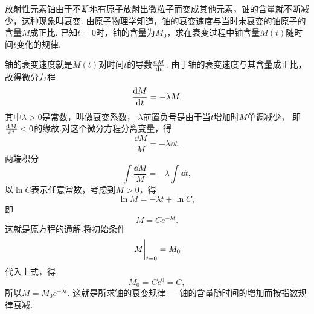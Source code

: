 \begin{example}
放射性元素铀由于不断地有原子放射出微粒子而变成其他元素，铀的含量就不断减少，这种现象叫衰变.
由原子物理学知道，铀的衰变速度与当时未衰变的铀原子的含量\(M\)成正比.
已知\(t=0\)时，铀的含量为\(M_0\)，求在衰变过程中铀含量\(M(t)\)随时间\(t\)变化的规律.
\begin{solution}
铀的衰变速度就是\(M(t)\)对时间\(t\)的导数\(\dv{M}{t}\).
由于铀的衰变速度与其含量成正比，故得微分方程\begin{equation*}
	\dv{M}{t} = -\lambda M,
\end{equation*}
其中\(\lambda > 0\)是常数，叫做衰变系数，
\(\lambda\)前置负号是由于当\(t\)增加时\(M\)单调减少，
即\(\dv{M}{t} < 0\)的缘故.对这个微分方程分离变量，得\begin{equation*}
	\frac{\dd{M}}{M} = -\lambda \dd{t}.
\end{equation*}两端积分\begin{equation*}
	\int \frac{\dd{M}}{M} = -\lambda \int \dd{t},
\end{equation*}
以\(\ln C\)表示任意常数，考虑到\(M>0\)，得\begin{equation*}
	\ln M = -\lambda t + \ln C,
\end{equation*}
即\begin{equation*}
	M = C e^{-\lambda t}.
\end{equation*}
这就是原方程的通解.将初始条件\begin{equation*}
	\eval{M}_{t=0} = M_0
\end{equation*}
代入上式，得\begin{equation*}
	M_0 = C e^0 = C,
\end{equation*}
所以\(M = M_0 e^{-\lambda t}\).
这就是所求铀的衰变规律 --- 铀的含量随时间的增加而按指数规律衰减.
\end{solution}
\end{example}

